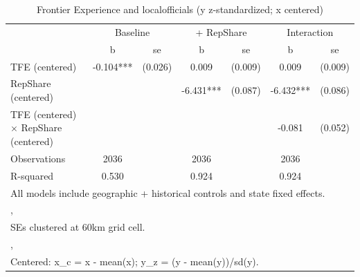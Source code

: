 \begin{table}[htbp]\centering
\def\sym#1{\ifmmode^{#1}\else\(^{#1}\)\fi}
\caption{Frontier Experience and localofficials (y z-standardized; x centered)}
\begin{tabular}{l*{3}{cc}}
\toprule
                &\multicolumn{2}{c}{Baseline}&\multicolumn{2}{c}{ + RepShare}&\multicolumn{2}{c}{Interaction}\\
                &        b   &       se&        b   &       se&        b   &       se\\
\midrule
TFE (centered)  &   -0.104***&  (0.026)&    0.009   &  (0.009)&    0.009   &  (0.009)\\
RepShare (centered)&            &         &   -6.431***&  (0.087)&   -6.432***&  (0.086)\\
TFE (centered) $\times$ RepShare (centered)&            &         &            &         &   -0.081   &  (0.052)\\
\midrule
Observations    &     2036   &         &     2036   &         &     2036   &         \\
R-squared       &    0.530   &         &    0.924   &         &    0.924   &         \\
\bottomrule
\multicolumn{7}{l}{\footnotesize All models include geographic + historical controls and state fixed effects.}\\
\multicolumn{7}{l}{\footnotesize ,}\\
\multicolumn{7}{l}{\footnotesize SEs clustered at 60km grid cell.}\\
\multicolumn{7}{l}{\footnotesize ,}\\
\multicolumn{7}{l}{\footnotesize Centered: x\_c = x - mean(x); y\_z = (y - mean(y))/sd(y).}\\
\end{tabular}
\end{table}
